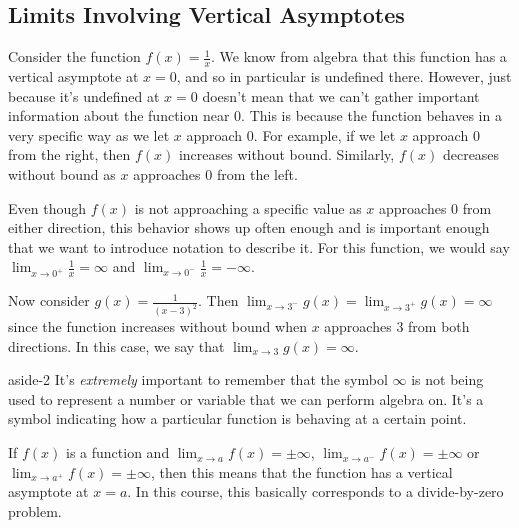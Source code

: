 \documentclass[10pt,]{book}
\numberwithin{equation}{section}
\begin{document}
\subsection[{Limits Involving Vertical Asymptotes}]{Limits Involving Vertical Asymptotes}\label{subsection-limits-involving-vertical-asymptotes}
\hypertarget{p-52}{}%
Consider the function \(f(x)=\frac{1}{x}\). We know from algebra that this function has a vertical asymptote at \(x=0\), and so in particular is undefined there. However, just because it's undefined at \(x=0\) doesn't mean that we can't gather important information about the function near \(0\). This is because the function behaves in a very specific way as we let \(x\) approach \(0\). For example, if we let \(x\) approach \(0\) from the right, then \(f(x)\) increases without bound. Similarly, \(f(x)\) decreases without bound as \(x\) approaches \(0\) from the left.%
\par
\hypertarget{p-53}{}%
Even though \(f(x)\) is not approaching a specific value as \(x\) approaches \(0\) from either direction, this behavior shows up often enough and is important enough that we want to introduce notation to describe it. For this function, we would say \(\lim_{x\to0^{+}}\frac{1}{x}=\infty\) and \(\lim_{x\to0^{-}}\frac{1}{x}=-\infty\).%
\par
\hypertarget{p-54}{}%
Now consider \(g(x) = \frac{1}{(x-3)^{2}}\). Then \(\lim_{x\to3^{-}}g(x) = \lim_{x\to3^{+}}g(x) = \infty\) since the function increases without bound when \(x\) approaches \(3\) from both directions. In this case, we say that \(\lim_{x\to3}g(x)=\infty\).%
\begin{aside}{}{aside-2}%
\hypertarget{p-55}{}%
It's \emph{extremely} important to remember that the symbol \(\infty\) is not being used to represent a number or variable that we can perform algebra on. It's a symbol indicating how a particular function is behaving at a certain point.%
\end{aside}
\hypertarget{p-56}{}%
If \(f(x)\) is a function and \(\lim_{x\to a}f(x)=\pm\infty\), \(\lim_{x\to a^{-}}f(x)=\pm\infty\) or \(\lim_{x\to a^{+}}f(x)=\pm\infty\), then this means that the function has a vertical asymptote at \(x=a\). In this course, this basically corresponds to a divide-by-zero problem.%
\end{document}
